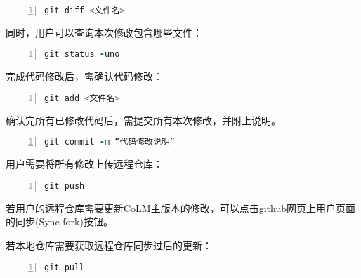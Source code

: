 \begin{lstlisting}[language=fortran, basicstyle=\linespread{1.0}\footnotesize\ttfamily, commentstyle=\color{black}, numbers=left, numberstyle=\tiny, xleftmargin=1.5em,xrightmargin=0em, aboveskip=1em]
   git diff <文件名>
\end{lstlisting}



同时，用户可以查询本次修改包含哪些文件：

\begin{lstlisting}[language=fortran, basicstyle=\linespread{1.0}\footnotesize\ttfamily, commentstyle=\color{black}, numbers=left, numberstyle=\tiny, xleftmargin=1.5em,xrightmargin=0em, aboveskip=1em]
   git status -uno
\end{lstlisting}

完成代码修改后，需确认代码修改：

\begin{lstlisting}[language=fortran, basicstyle=\linespread{1.0}\footnotesize\ttfamily, commentstyle=\color{black}, numbers=left, numberstyle=\tiny, xleftmargin=1.5em,xrightmargin=0em, aboveskip=1em]
   git add <文件名>
\end{lstlisting}

确认完所有已修改代码后，需提交所有本次修改，并附上说明。

\begin{lstlisting}[language=fortran, basicstyle=\linespread{1.0}\footnotesize\ttfamily, commentstyle=\color{black}, numbers=left, numberstyle=\tiny, xleftmargin=1.5em,xrightmargin=0em, aboveskip=1em]
   git commit -m “代码修改说明”
\end{lstlisting}

用户需要将所有修改上传远程仓库：

\begin{lstlisting}[language=fortran, basicstyle=\linespread{1.0}\footnotesize\ttfamily, commentstyle=\color{black}, numbers=left, numberstyle=\tiny, xleftmargin=1.5em,xrightmargin=0em, aboveskip=1em]
   git push
\end{lstlisting}

若用户的远程仓库需要更新CoLM主版本的修改，可以点击github网页上用户页面的同步(Sync fork)按钮。

若本地仓库需要获取远程仓库同步过后的更新：

\begin{lstlisting}[language=fortran, basicstyle=\linespread{1.0}\footnotesize\ttfamily, commentstyle=\color{black}, numbers=left, numberstyle=\tiny, xleftmargin=1.5em,xrightmargin=0em, aboveskip=1em]
   git pull
\end{lstlisting}


